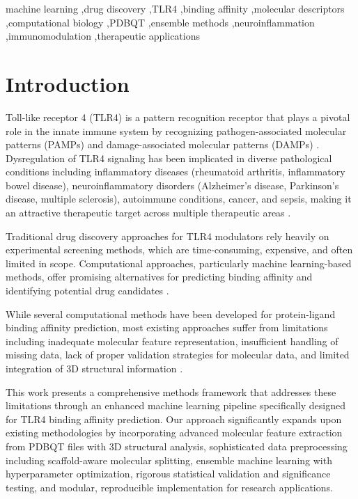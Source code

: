 \documentclass[preprint, 10pt]{elsarticle}
\begin{document}
\begin{frontmatter}
\begin{keyword}
machine learning \sep drug discovery \sep TLR4 \sep binding affinity \sep molecular descriptors \sep computational biology \sep PDBQT \sep ensemble methods \sep neuroinflammation \sep immunomodulation \sep therapeutic applications
\end{keyword}

\end{frontmatter}

\linenumbers

\section{Introduction}

Toll-like receptor 4 (TLR4) is a pattern recognition receptor that plays a pivotal role in the innate immune system by recognizing pathogen-associated molecular patterns (PAMPs) and damage-associated molecular patterns (DAMPs) \cite{akira2006toll}. Dysregulation of TLR4 signaling has been implicated in diverse pathological conditions including inflammatory diseases (rheumatoid arthritis, inflammatory bowel disease), neuroinflammatory disorders (Alzheimer's disease, Parkinson's disease, multiple sclerosis), autoimmune conditions, cancer, and sepsis, making it an attractive therapeutic target across multiple therapeutic areas \cite{kanzler2007therapeutic}.

Traditional drug discovery approaches for TLR4 modulators rely heavily on experimental screening methods, which are time-consuming, expensive, and often limited in scope. Computational approaches, particularly machine learning-based methods, offer promising alternatives for predicting binding affinity and identifying potential drug candidates \cite{chen2018rise}.

While several computational methods have been developed for protein-ligand binding affinity prediction, most existing approaches suffer from limitations including inadequate molecular feature representation, insufficient handling of missing data, lack of proper validation strategies for molecular data, and limited integration of 3D structural information \cite{jimenez2018kdeep}.

This work presents a comprehensive methods framework that addresses these limitations through an enhanced machine learning pipeline specifically designed for TLR4 binding affinity prediction. Our approach significantly expands upon existing methodologies by incorporating advanced molecular feature extraction from PDBQT files with 3D structural analysis, sophisticated data preprocessing including scaffold-aware molecular splitting, ensemble machine learning with hyperparameter optimization, rigorous statistical validation and significance testing, and modular, reproducible implementation for research applications.
\end{document}
